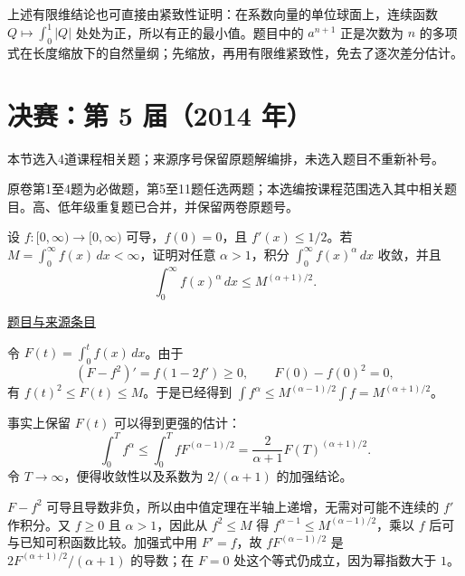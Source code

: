 \documentclass[UTF8,12pt,a4paper,fontset=fandol]{ctexart}
\begin{document}
\begin{remark}[方法与条件]上述有限维结论也可直接由紧致性证明：在系数向量的单位球面上，连续函数 $Q\mapsto\int_0^1|Q|$ 处处为正，所以有正的最小值。题目中的 $a^{n+1}$ 正是次数为 $n$ 的多项式在长度缩放下的自然量纲；先缩放，再用有限维紧致性，免去了逐次差分估计。\end{remark}

\section{决赛：第 5 届（2014 年）}

本节选入4道课程相关题；来源序号保留原题解编排，未选入题目不重新补号。

\begin{remark}[来源说明]原卷第1至4题为必做题，第5至11题任选两题；本选编按课程范围选入其中相关题目。高、低年级重复题已合并，并保留两卷原题号。\end{remark}

\begin{example}[来源序号3]\label{ex:fin05-hi:3}\label{pr:fin05-hi:3}

设 $f:[0,\infty)\to[0,\infty)$ 可导，$f(0)=0$，且 $f'(x)\le1/2$。若 $M=\int_0^\infty f(x)\,dx<\infty$，证明对任意 $\alpha>1$，积分 $\int_0^\infty f(x)^\alpha\,dx$ 收敛，并且
\[
\int_0^\infty f(x)^\alpha\,dx\le M^{(\alpha+1)/2}.
\]

\par\href{https://github.com/lzxcr/cmc-mathematics/blob/64916fa1fdbc3e444a652eca204d5669058ee321/src/problems/finals/05/03.md}{题目与来源条目}

\end{example}

\begin{solve}\label{ans:fin05-hi:3}

令 $F(t)=\int_0^t f(x)\,dx$。由于
\[
(F-f^2)'=f(1-2f')\ge0,\qquad F(0)-f(0)^2=0,
\]
有 $f(t)^2\le F(t)\le M$。于是已经得到
$\int f^\alpha\le M^{(\alpha-1)/2}\int f=M^{(\alpha+1)/2}$。

事实上保留 $F(t)$ 可以得到更强的估计：
\[
\int_0^T f^\alpha
\le\int_0^T fF^{(\alpha-1)/2}
=\frac{2}{\alpha+1}F(T)^{(\alpha+1)/2}.
\]
令 $T\to\infty$，便得收敛性以及系数为 $2/(\alpha+1)$ 的加强结论。

$F-f^2$ 可导且导数非负，所以由中值定理在半轴上递增，无需对可能不连续的 $f'$ 作积分。又 $f\ge0$ 且 $\alpha>1$，因此从 $f^2\le M$ 得 $f^{\alpha-1}\le M^{(\alpha-1)/2}$，乘以 $f$ 后可与已知可积函数比较。加强式中用 $F'=f$，故 $fF^{(\alpha-1)/2}$ 是 $2F^{(\alpha+1)/2}/(\alpha+1)$ 的导数；在 $F=0$ 处这个等式仍成立，因为幂指数大于 $1$。

\end{solve}
\end{document}
